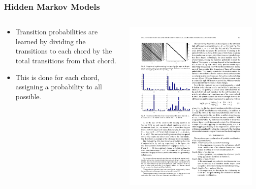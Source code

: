 \documentclass{beamer}
\begin{document}
\begin{frame}
	\frametitle{Hidden Markov Models}
	
	\begin{columns}
	\begin{column}{.6\textwidth}
		\begin{itemize}
			\item Transition probabilities are learned by dividing the transitions to each chord by the total transitions from that chord.
			\item This is done for each chord, assigning a probability to all possible.
		\end{itemize}
	\end{column}
	\begin{column}{.4\textwidth}
	\includegraphics[width=.95\textwidth]{transitionProbabilities.pdf} \\

\end{column}
\end{columns}
\end{frame}
\end{document}
